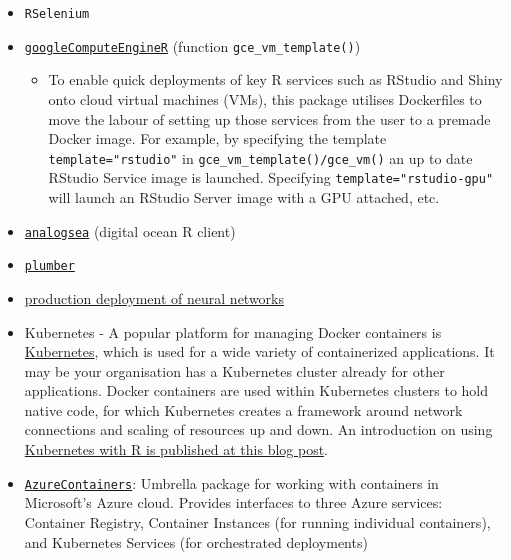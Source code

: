 \begin{itemize}
\tightlist
\item
  \texttt{RSelenium}
\item
  \href{https://cloudyr.github.io/googleComputeEngineR/}{\texttt{googleComputeEngineR}}
  (function \texttt{gce\_vm\_template()})

  \begin{itemize}
  \tightlist
  \item
    To enable quick deployments of key R services such as RStudio and
    Shiny onto cloud virtual machines (VMs), this package utilises
    Dockerfiles to move the labour of setting up those services from the
    user to a premade Docker image. For example, by specifying the
    template \texttt{template="rstudio"} in
    \texttt{gce\_vm\_template()/gce\_vm()} an up to date RStudio Service
    image is launched. Specifying \texttt{template="rstudio-gpu"} will
    launch an RStudio Server image with a GPU attached, etc.\\
  \end{itemize}
\item
  \href{https://github.com/sckott/analogsea}{\texttt{analogsea}}
  (digital ocean R client)
\item
  \href{https://www.rplumber.io/docs/hosting.html\#docker}{\texttt{plumber}}
\item
  \href{https://github.com/tmobile/r-tensorflow-api}{production
  deployment of neural networks} \citep[\citet{nolistic}]{jnolis}
\item
  Kubernetes - A popular platform for managing Docker containers is
  \href{https://kubernetes.io/}{Kubernetes}, which is used for a wide
  variety of containerized applications. It may be your organisation has
  a Kubernetes cluster already for other applications. Docker containers
  are used within Kubernetes clusters to hold native code, for which
  Kubernetes creates a framework around network connections and scaling
  of resources up and down. An introduction on using
  \href{https://code.markedmondson.me/r-on-kubernetes-serverless-shiny-r-apis-and-scheduled-scripts/}{Kubernetes
  with R is published at this blog post}.
\item
  \href{https://cran.r-project.org/package=AzureContainers}{\texttt{AzureContainers}}:
  Umbrella package for working with containers in Microsoft's Azure
  cloud. Provides interfaces to three Azure services: Container
  Registry, Container Instances (for running individual containers), and
  Kubernetes Services (for orchestrated deployments)
\end{itemize}

